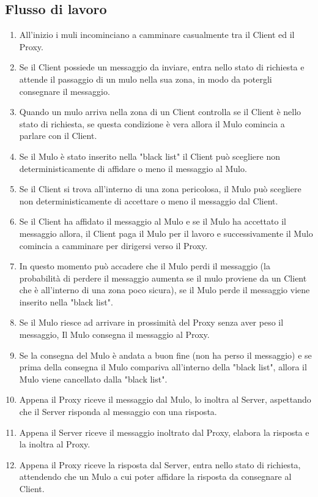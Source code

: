 \documentclass[13pt,a4paper]{article}
\begin{document}
\subsection{Flusso di lavoro}
\begin{enumerate}
	\item All'inizio i muli incominciano a camminare casualmente tra il Client ed il Proxy.
	\item  Se il Client possiede un messaggio da inviare, entra nello stato di richiesta e attende il passaggio di un mulo nella sua zona, in modo da potergli consegnare il messaggio.
	\item Quando un mulo arriva nella zona di un Client controlla se il Client è nello stato di richiesta, se questa condizione è vera allora il Mulo comincia a parlare con il Client.
	\item Se il Mulo è stato inserito nella "black list" il Client può scegliere non deterministicamente di affidare o meno il messaggio al Mulo.
	\item Se il Client si trova all'interno di una zona pericolosa, il Mulo può scegliere non deterministicamente di accettare o meno il messaggio dal Client. 
	\item Se il Client ha affidato il messaggio al Mulo e se il Mulo ha accettato il messaggio allora, il Client paga il Mulo per il lavoro e successivamente il Mulo comincia a camminare per dirigersi verso il Proxy.
	\item In questo momento può accadere che il Mulo perdi il messaggio (la probabilità di perdere il messaggio aumenta se il mulo proviene da un Client che è all'interno di una zona poco sicura), se il Mulo perde il messaggio viene inserito nella "black list".
	\item Se il Mulo riesce ad arrivare in prossimità del Proxy senza aver peso il messaggio, Il Mulo consegna il messaggio al Proxy.
	\item Se la consegna del Mulo è andata a buon fine (non ha perso il messaggio) e se prima della consegna il Mulo compariva all'interno della "black list", allora il Mulo viene cancellato dalla "black list".
	\item Appena il Proxy riceve il messaggio dal Mulo, lo inoltra al Server, aspettando che il Server risponda al messaggio con una risposta.
	\item Appena il Server riceve il messaggio inoltrato dal Proxy, elabora la risposta e la inoltra al Proxy.
	\item Appena il Proxy riceve la risposta dal Server, entra nello stato di richiesta, attendendo che un Mulo a cui poter affidare la risposta da consegnare al Client.

\end{enumerate}
\end{document}

